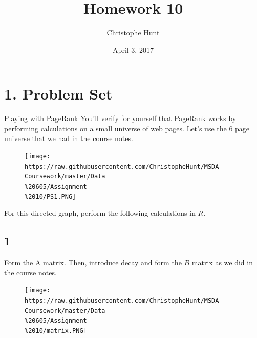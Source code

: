 \documentclass[]{article}
\title{Homework 10}
\author{Christophe Hunt}
\date{April 3, 2017}
\begin{document}
\maketitle

{
\setcounter{tocdepth}{2}
\tableofcontents
}
\section{1. Problem Set}\label{problem-set}

Playing with PageRank You'll verify for yourself that PageRank works by
performing calculations on a small universe of web pages. Let's use the
6 page universe that we had in the course notes.

\begin{figure}[htbp]
\centering
\texttt{[image: https://raw.githubusercontent.com/ChristopheHunt/MSDA---Coursework/master/Data\\\%20605/Assignment\\\%2010/PS1.PNG]}
\caption{}
\end{figure}

For this directed graph, perform the following calculations in \(R\).

\subsection{1}\label{section}

Form the A matrix. Then, introduce decay and form the \(B\) matrix as we
did in the course notes.

\begin{figure}[htbp]
\centering
\texttt{[image: https://raw.githubusercontent.com/ChristopheHunt/MSDA---Coursework/master/Data\\\%20605/Assignment\\\%2010/matrix.PNG]}
\caption{}
\end{figure}
\end{document}
